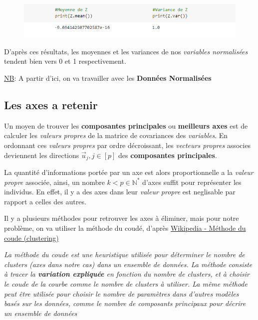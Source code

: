 \documentclass{article}
\begin{document}
\begin{figure}[h!]
\includegraphics[width=\linewidth]{images/mean_variance.png}
\end{figure}

D'après ces résultats, les moyennes et les variances de nos \textit{variables normalisées} tendent bien vers 0 et 1 respectivement.
\newline

\newpage

\begin{flushleft}
\underline{NB}: A partir d'ici, on va travailler avec les \textbf{Données Normalisées} 
\end{flushleft}

\subsection{Les axes a retenir}

Un moyen de trouver les \textbf{composantes principales} ou \textbf{meilleurs axes} est de calculer les \textit{valeurs propres} de la matrice de covariances des \textit{variables}. En ordonnant ces \textit{valeurs propres} par ordre décroissant, les \textit{vecteurs propres} associes deviennent les directions $\vec{u}_j,j \in [p]$ des \textbf{composantes principales}.
\newline

La quantité d'informations portée par un axe est alors proportionnelle a la \textit{valeur propre} associée, ainsi, un nombre $k<p \in \mathbb{N}^*$ d'axes suffit pour représenter les individus. En effet, il y a des axes dans leur \textit{valeur propre} est neglisable par rapport a celles des autres.
\newline

Il y a plusieurs méthodes pour retrouver les axes à éliminer, mais pour notre problème, on va utiliser la méthode du coudé, d'après \href{https://fr.qaz.wiki/wiki/Elbow_method_(clustering)}{Wikipedia - Méthode du coude (clustering)} 
\newline

\textit{La méthode du coude est une heuristique utilisée pour déterminer le nombre de clusters (axes dans notre cas) dans un ensemble de données. La méthode consiste à tracer la \textbf{variation expliquée} en fonction du nombre de clusters, et à choisir le coude de la courbe comme le nombre de clusters à utiliser. La même méthode peut être utilisée pour choisir le nombre de paramètres dans d'autres modèles basés sur les données, comme le nombre de composants principaux pour décrire un ensemble de données}
\newline
\end{document}
